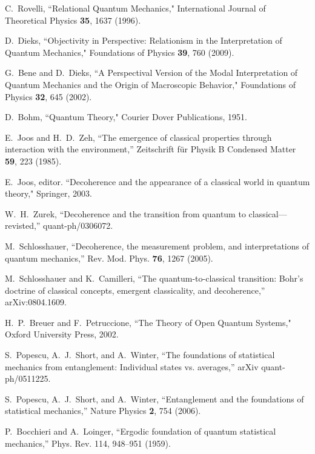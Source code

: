 \documentclass[%
preprint,
nofootinbib,
 amsmath,amssymb,
aps,
]{revtex4-1}
\begin{document}
\begin{thebibliography}{10}
C.~Rovelli, ``Relational Quantum Mechanics," International Journal of Theoretical Physics {\bf35}, 1637 (1996). 
 
D.~Dieks, ``Objectivity in Perspective: Relationism in the Interpretation of Quantum Mechanics," Foundations of Physics {\bf39}, 760 (2009).    
 
 
G.~Bene and D.~Dieks, ``A Perspectival Version of the Modal Interpretation of Quantum Mechanics and the Origin of Macroscopic Behavior," Foundations of Physics {\bf32}, 645 (2002).


D.~Bohm,  ``Quantum Theory," Courier Dover Publications, 1951. 

E.~Joos and H.~D.~Zeh,
   ``The emergence of classical properties through interaction with the
  environment,''
   Zeitschrift f{\"u}r Physik B Condensed Matter {\bf59}, 223 (1985).

E.~Joos, editor.
   ``Decoherence and the appearance of a classical world in quantum
  theory," Springer, 2003.

W.~H.~Zurek,
   ``Decoherence and the transition from quantum to classical---revisted,''
   quant-ph/0306072.

M.~Schlosshauer,
   ``Decoherence, the measurement problem, and interpretations of
  quantum mechanics,''
   Rev. Mod. Phys. {\bf76}, 1267 (2005).

M.~Schlosshauer and K.~Camilleri,
   ``The quantum-to-classical transition: Bohr's doctrine of classical
  concepts, emergent classicality, and decoherence,'' arXiv:0804.1609.  
  
H.~P.~Breuer and F.~Petruccione,
   ``The Theory of Open Quantum Systems,"
   Oxford University Press, 2002.

S.~Popescu, A.~J.~Short, and A.~Winter,
   ``The foundations of statistical mechanics from entanglement:
  Individual states vs. averages,'' arXiv quant-ph/0511225.

S.~Popescu, A.~J.~Short, and A.~Winter,
   ``Entanglement and the foundations of statistical mechanics,''
   Nature Physics {\bf2}, 754 (2006).

P.~Bocchieri and A.~Loinger, ``Ergodic foundation of quantum statistical mechanics,'' Phys. Rev. 114, 948–951 (1959). 


\end{thebibliography}
\end{document}
